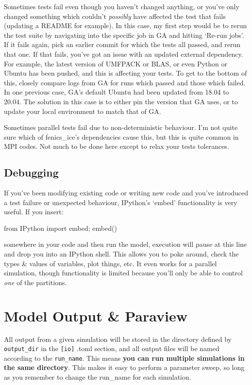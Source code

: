 \documentclass[11pt, reqno, nocenter]{article}
\begin{document}
Sometimes tests fail even though you haven't changed anything, or you've only changed something which couldn't \emph{possibly} have affected the test that fails (updating a README for example). In this case, my first step would be to rerun the test suite by navigating into the specific job in GA and hitting `Re-run jobs'. If it fails again, pick an earlier commit for which the tests all passed, and rerun that one. If that fails, you've got an issue with an updated external dependency. For example, the latest version of UMFPACK or BLAS, or even Python or Ubuntu has been pushed, and this is affecting your tests. To get to the bottom of this, closely compare logs from GA for runs which passed and those which failed. In one previous case, GA's default Ubuntu had been updated from 18.04 to 20.04. The solution in this case is to either pin the version that GA uses, or to update your local environment to match that of GA.

Sometimes parallel tests fail due to non-deterministic behaviour. I'm not quite sure which of fenics\_ice's dependencies cause this, but this is quite common in MPI codes. Not much to be done here except to relax your tests tolerances.

\subsection{Debugging}

If you've been modifying existing code or writing new code and you've introduced a test failure or unexpected behaviour, IPython's `embed' functionality is very useful. If you insert:

\begin{spverbatim}
from IPython import embed; embed()
\end{spverbatim}

somewhere in your code and then run the model, execution will pause at this line and drop you into an IPython shell. This allows you to poke around, check the types \& values of variables, plot things, etc. It even works for a parallel simulation, though functionality is limited because you'll only be able to control \emph{one} of the partitions.
\section{Model Output \& Paraview}

All output from a given simulation will be stored in the directory defined by \texttt{output\_dir} in the \texttt{[io]} .toml section, and all output files will be named according to the \texttt{run\_name}. This means \textbf{you can run multiple simulations in the same directory}. This makes it easy to perform a parameter sweep, so long as you remember to change the run\_name for each simulation.
\end{document}
